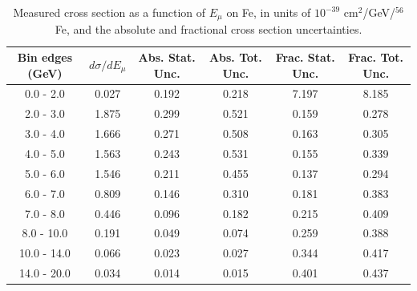 \documentclass[aps,prl,twocolumn,superscriptaddress,nofootinbib]{revtex4-1}
\begin{document}
\begin{table}[h!]
  \centering
  \caption{Measured cross section as a function of $E_{\mu}$ on Fe, in units of
  $10^{-39}$ $\text{cm}^{2}$/GeV/$^{56}$Fe, and the absolute and
  fractional cross section uncertainties.}
    \begin{tabular}{c||c||c|c||c|c}
      Bin edges (GeV)  &  $d\sigma/dE_{\mu}$  &  Abs. Stat. Unc. & Abs. Tot. Unc.  &  Frac. Stat. Unc.  &  Frac. Tot. Unc. \\
      \hline\hline
        0.0 - 2.0 & 0.027 & 0.192 & 0.218 & 7.197 & 8.185 \\
        2.0 - 3.0 & 1.875 & 0.299 & 0.521 & 0.159 & 0.278 \\
        3.0 - 4.0 & 1.666 & 0.271 & 0.508 & 0.163 & 0.305 \\
        4.0 - 5.0 & 1.563 & 0.243 & 0.531 & 0.155 & 0.339 \\
        5.0 - 6.0 & 1.546 & 0.211 & 0.455 & 0.137 & 0.294 \\
        6.0 - 7.0 & 0.809 & 0.146 & 0.310 & 0.181 & 0.383 \\
        7.0 - 8.0 & 0.446 & 0.096 & 0.182 & 0.215 & 0.409 \\
       8.0 - 10.0 & 0.191 & 0.049 & 0.074 & 0.259 & 0.388 \\
      10.0 - 14.0 & 0.066 & 0.023 & 0.027 & 0.344 & 0.417 \\
      14.0 - 20.0 & 0.034 & 0.014 & 0.015 & 0.401 & 0.437 \\
    \end{tabular}
  \label{table:EmuXSec_Fe}
\end{table}
\end{document}
